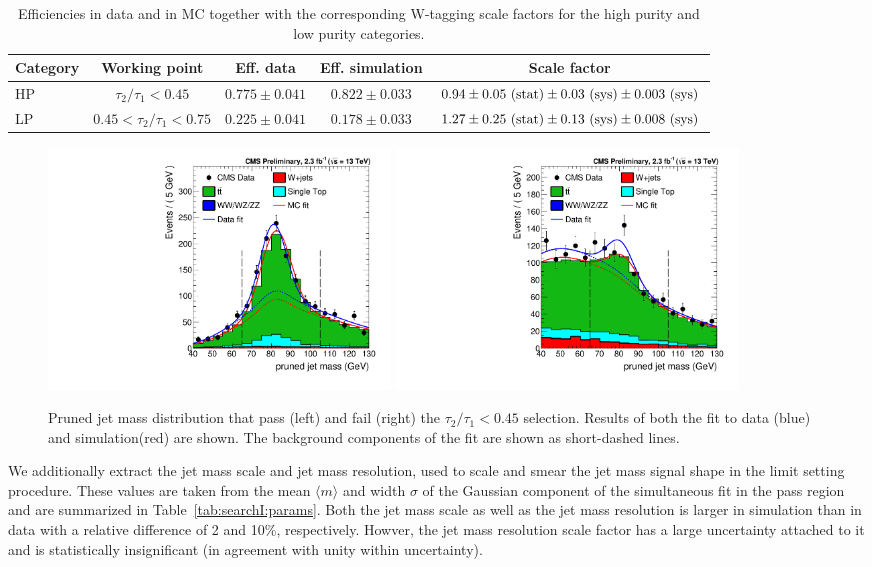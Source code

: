 \begin{table}[h!]
   \centering
   \footnotesize
   \begin{tabular}{| l | c | c | c | c |}
   \hline
   Category & Working point & Eff. data & Eff. simulation & Scale factor\\
   \hline
   HP&$\tau_2 / \tau_1 < 0.45$& $0.775 \pm 0.041 $& $0.822 \pm 0.033$ &$0.94 \pm 0.05~\rm{(stat)} \pm 0.03~\rm{(sys)} \pm 0.003~\rm{(sys)}$\\
   LP&$0.45 < \tau_2 / \tau_1 < 0.75$& $0.225 \pm 0.041 $& $0.178 \pm 0.033$ &$1.27 \pm 0.25~\rm{(stat)} \pm 0.13~\rm{(sys)} \pm 0.008~\rm{(sys)}$\\
   \hline
   \end{tabular}
   \caption{Efficiencies in data and in MC together with the corresponding W-tagging scale factors for the high purity and low purity categories. }
   \label{tab:searchI:WtagSFs}
\end{table}


\begin{figure}[h!]
\centering
\includegraphics[width=0.44\textwidth]{figures/vtagging/AN-16-215/_HP0v45powheg_76X_em_pTbin_200_5000.pdf}
\includegraphics[width=0.44\textwidth]{figures/vtagging/AN-16-215/_HP0v45powheg_76X_em_fail_pTbin_200_5000.pdf} \\
\caption{Pruned jet mass distribution that pass (left) and fail (right) the $\tau_2 / \tau_1 < 0.45$ selection. Results of both the fit to data (blue) and simulation(red) are shown. The background components of the fit are shown as short-dashed lines.}
\label{fig:searchII:simfit}
\end{figure}

We additionally extract the jet mass scale and jet mass resolution, used to scale and smear the jet mass signal shape in the limit setting procedure. These values are taken from the mean $\langle m \rangle$ and width $\sigma$ of the Gaussian
component of the simultaneous fit in the pass region and are summarized in Table~\ref{tab:searchI:params}. Both the jet mass scale as well as the jet mass resolution is larger in simulation than in data with a relative difference of 2 and 10\%, respectively.
Howver, the jet mass resolution scale factor has a large uncertainty attached to it and is statistically insignificant (in agreement with unity within uncertainty).

